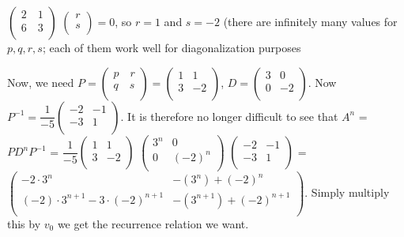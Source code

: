 \documentclass[11pt,a4paper]{article}
\begin{document}
$\left(\begin{array}{cc}
2\quad 1\\
6\quad 3\\
\end{array}\right)$
$\left(\begin{array}{cc}
r\\
s\\
\end{array}\right)=0$, so $r=1$ and $s=-2$ (there are infinitely many values for $p, q, r, s$; each of them work well for diagonalization purposes

Now, we need $P=\left(\begin{array}{cc}
p\quad r\\
q\quad s\\
\end{array}\right)=
\left(\begin{array}{cc}
1 & 1\\
3 & -2\\
\end{array}\right)$, $D=\left(\begin{array}{cc}
3 & 0\\
0 & -2\\
\end{array}\right)$. Now $P^{-1}=\dfrac{1}{-5}\left(\begin{array}{cc}
-2 & -1\\
-3 & 1\\
\end{array}\right)$. It is therefore no longer difficult to see that $A^n$ = $PD^nP^{-1}$ = $\dfrac{1}{-5}\left(\begin{array}{cc}
1 &1\\
3 & -2\\
\end{array}\right)$
$\left(\begin{array}{cc}
3^n & 0\\
0 & (-2)^n\\
\end{array}\right)$
$\left(\begin{array}{cc}
-2 & -1\\
-3 & 1\\
\end{array}\right)$ = $\left(\begin{array}{cc}
-2\cdot3^n & -(3^n)+(-2)^n\\
(-2)\cdot 3^{n+1}-3\cdot (-2)^{n+1} & -(3^{n+1})+(-2)^{n+1}\\
\end{array}\right).$ Simply multiply this by $v_0$ we get the recurrence relation we want.
\end{document}

